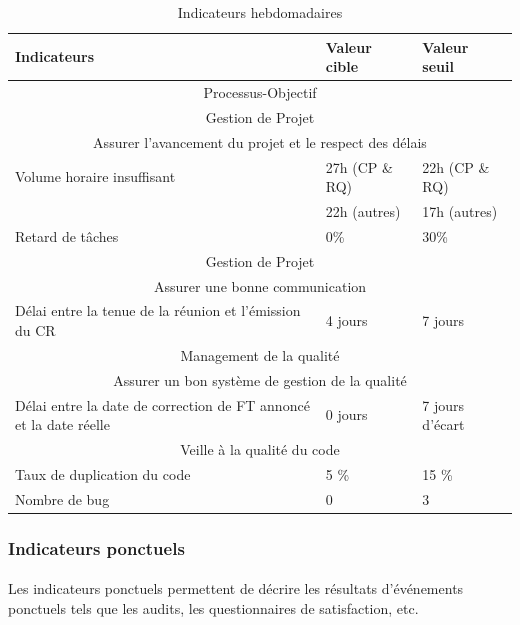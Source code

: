 \begin{table}[H]

\begin{tabular}[h]{|p{}|p{}|p{}|}
	\hline
	\rowcolor[gray]{0.85}
	Indicateurs & Valeur cible & Valeur seuil \\\hline
	\multicolumn{3}{|c|}{Processus-Objectif} \\\hline
	\multicolumn{3}{|c|}{\cellcolor[gray]{0.85} Gestion de Projet} \\
	\multicolumn{3}{|c|}{\cellcolor[gray]{0.85} Assurer l'avancement du projet et le respect des délais} \\\hline
	Volume horaire insuffisant & 27h (CP \& RQ) & 22h (CP \& RQ)  \\
	 & 22h (autres) & 17h (autres)  \\\hline
	Retard de tâches & 0\% & 30\% \\\hline
	\multicolumn{3}{|c|}{\cellcolor[gray]{0.85} Gestion de Projet} \\
	\multicolumn{3}{|c|}{\cellcolor[gray]{0.85} Assurer une bonne communication} \\\hline
	Délai entre la tenue de la réunion et l'émission du CR & 4 jours & 7 jours \\\hline
	\multicolumn{3}{|c|}{\cellcolor[gray]{0.85} Management de la qualité} \\
	\multicolumn{3}{|c|}{\cellcolor[gray]{0.85} Assurer un bon système de gestion de la qualité} \\\hline
	Délai entre la date de correction de FT annoncé et la date réelle & 0 jours & 7 jours d'écart \\\hline
	\multicolumn{3}{|c|}{\cellcolor[gray]{0.85} Veille à la qualité du code} \\
	Taux de duplication du code & 5 \% & 15 \% \\\hline
	Nombre de bug & 0 & 3 \\\hline
	
\end{tabular}
\caption{Indicateurs hebdomadaires} \label{Tableau 6.1}
\end{table}


\subsubsection*{Indicateurs ponctuels}
\label{Indicateurs ponctuels}
\paragraph*{} Les indicateurs ponctuels permettent de décrire les résultats d’événements ponctuels tels que les audits, les questionnaires de satisfaction, etc.

